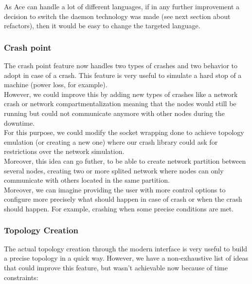 \documentclass{eplmastersthesis}
\begin{document}
        As Ace can handle a lot of different languages, if in any further
        improvement a decision to switch the daemon technology was made (see
        next section about refactors), then it would be easy to change the
        targeted language.

        \subsubsection{Crash point}

          The crash point feature now handles two types of crashes and two
          behavior to adopt in case of a crash. This feature is very useful
          to simulate a hard stop of a machine (power loss, for example).\\

          However, we could improve this by adding new types of crashes like a
          network crash or network compartmentalization meaning that the
          nodes would still be running but could not communicate anymore
          with other nodes during the downtime.\\
          For this purpose, we could modify the socket wrapping done to achieve
          topology emulation (or creating a new one) where our crash library could ask
          for restrictions over the network simulation.\\
          Moreover, this idea can go futher, to be able to create network partition between 
          several nodes, creating two or more splited network where nodes can 
          only communicate with others located in the same partition.\\ 

          Moreover, we can imagine providing the user with more control options
          to configure more precisely what should happen in case of crash or
          when the crash should happen. For example, crashing when some
          precise conditions are met.

        \subsubsection{Topology Creation}

          The actual topology creation through the modern interface is very
          useful to build a precise topology in a quick way. However, we have
          a non-exhaustive list of ideas that could improve this feature, but
          wasn't achievable now because of time constraints:
\end{document}

